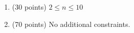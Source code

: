 \begin{enumerate}
    \tightlist
    \item (30 points) $2 \leq n \leq 10$
    \item (70 points)  No additional constraints.
\end{enumerate}
    